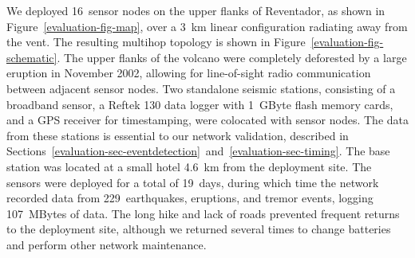 We deployed 16~sensor nodes on the upper flanks of Reventador, as shown in
Figure~\ref{evaluation-fig-map}, over a 3~km linear configuration radiating
away from the vent. The resulting multihop topology is shown in
Figure~\ref{evaluation-fig-schematic}. The upper flanks of the volcano were
completely deforested by a large eruption in November 2002, allowing for
line-of-sight radio communication between adjacent sensor nodes.  Two
standalone seismic stations, consisting of a broadband sensor, a Reftek 130
data logger with 1~GByte flash memory cards, and a GPS receiver for
timestamping, were colocated with sensor nodes. The data from these stations
is essential to our network validation, described in
Sections~\ref{evaluation-sec-eventdetection}~and~\ref{evaluation-sec-timing}.
The base station was located at a small hotel 4.6~km from the deployment
site.  The sensors were deployed for a total of 19~days, during which time
the network recorded data from 229~earthquakes, eruptions, and tremor events,
logging 107~MBytes of data. The long hike and lack of roads prevented
frequent returns to the deployment site, although we returned several times
to change batteries and perform other network maintenance.



%
%
%

